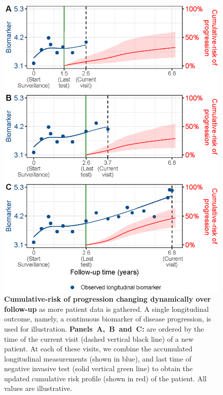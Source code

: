 \begin{figure}
\centerline{\includegraphics{images/dynrisk_plot_102.eps}}
\caption{\textbf{Cumulative-risk of progression changing dynamically over follow-up} as more patient data is gathered. A single longitudinal outcome, namely, a continuous biomarker of disease progression, is used for illustration. \textbf{Panels~A,~B~and~C:} are ordered by the time of the current visit (dashed vertical black line) of a new patient. At each of these visits, we combine the accumulated longitudinal measurements (shown in blue), and last time of negative invasive test (solid vertical green line) to obtain the updated cumulative risk profile (shown in red) of the patient. All values are illustrative.} 
\label{fig:dynrisk_explanation}
\end{figure}

